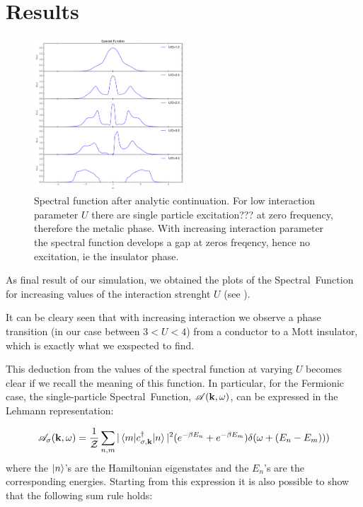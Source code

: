 \section{Results}
\begin{figure}[ht]
	\centering
	\includegraphics[width=0.5\textwidth ]{Mott_transition}
	\caption{Spectral function after analytic continuation. For low interaction parameter $U$ there are single particle excitation??? at zero frequency, therefore the metalic phase. With increasing interaction parameter the spectral function develops a gap at zeros freqency, hence no excitation, ie the insulator phase.}
	\label{fig:spectralf}
\end{figure}
As final result of our simulation, we obtained the plots of the Spectral~Function for increasing values of the interaction strenght $U$ (see ).

It can be cleary seen that with increasing interaction we observe a phase transition (in our case between $3<U<4$) from a conductor to a Mott insulator, which is exactly what we exspected to find. 

This deduction from the values of the spectral function at varying $U$ becomes clear if we recall the meaning of this function.  
In particular, for the Fermionic case, the single-particle Spectral~Function, $\mathscr{A(\bold{k},\omega)}$, can be expressed in the Lehmann representation: 

\begin{equation}\label{S.P.}
\mathscr{A}_\sigma(\bold{k},\omega) = \frac{1}{\mathcal{Z}}\sum_{n,m}|\braket{m|c_\bold{\sigma,k}^\dagger|n}|^2 (e^{-\beta E_n} + e^{-\beta E_m})\delta(\omega+(E_n-E_m)))
\end{equation}
where the $\ket{n}$'s are the Hamiltonian eigenstates and the $E_n$'s are the corresponding energies. 
Starting from this expression it is also possible to show that the following sum rule holds:

